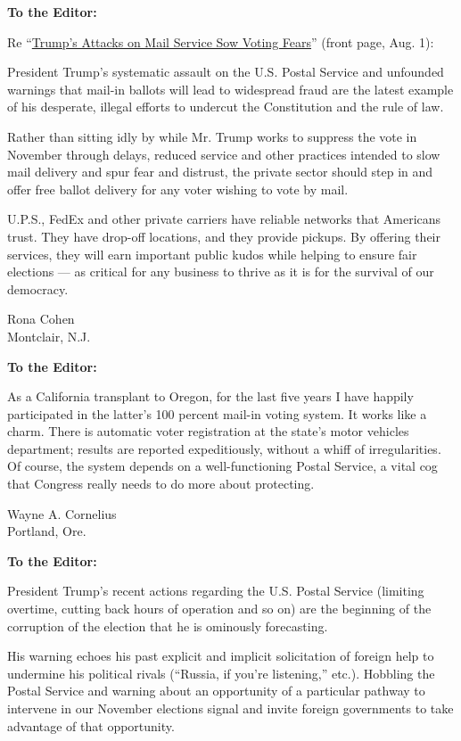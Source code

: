 \textbf{To the Editor:}

Re
``\href{https://www.nytimes.com/2020/07/31/us/politics/trump-usps-mail-delays.html?searchResultPosition=38}{Trump's
Attacks on Mail Service Sow Voting Fears}'' (front page, Aug. 1):

President Trump's systematic assault on the U.S. Postal Service and
unfounded warnings that mail-in ballots will lead to widespread fraud
are the latest example of his desperate, illegal efforts to undercut the
Constitution and the rule of law.

Rather than sitting idly by while Mr. Trump works to suppress the vote
in November through delays, reduced service and other practices intended
to slow mail delivery and spur fear and distrust, the private sector
should step in and offer free ballot delivery for any voter wishing to
vote by mail.

U.P.S., FedEx and other private carriers have reliable networks that
Americans trust. They have drop-off locations, and they provide pickups.
By offering their services, they will earn important public kudos while
helping to ensure fair elections --- as critical for any business to
thrive as it is for the survival of our democracy.

Rona Cohen\\
Montclair, N.J.

\textbf{To the Editor:}

As a California transplant to Oregon, for the last five years I have
happily participated in the latter's 100 percent mail-in voting system.
It works like a charm. There is automatic voter registration at the
state's motor vehicles department; results are reported expeditiously,
without a whiff of irregularities. Of course, the system depends on a
well-functioning Postal Service, a vital cog that Congress really needs
to do more about protecting.

Wayne A. Cornelius\\
Portland, Ore.

\textbf{To the Editor:}

President Trump's recent actions regarding the U.S. Postal Service
(limiting overtime, cutting back hours of operation and so on) are the
beginning of the corruption of the election that he is ominously
forecasting.

His warning echoes his past explicit and implicit solicitation of
foreign help to undermine his political rivals (``Russia, if you're
listening,'' etc.). Hobbling the Postal Service and warning about an
opportunity of a particular pathway to intervene in our November
elections signal and invite foreign governments to take advantage of
that opportunity.

